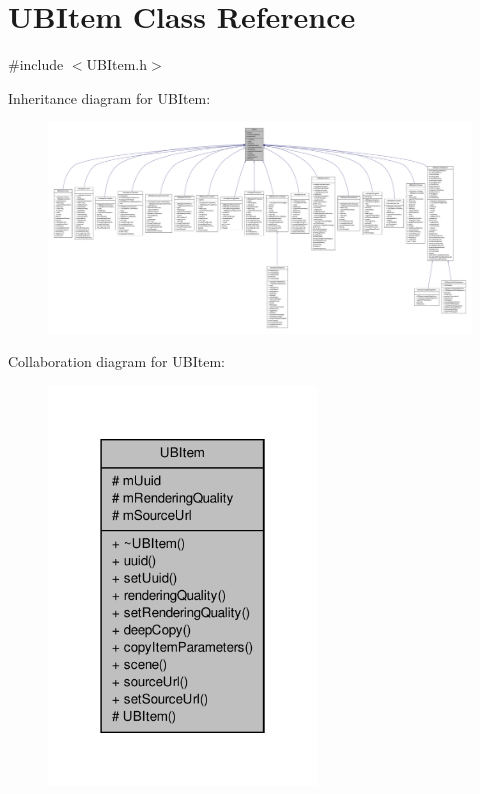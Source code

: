\hypertarget{class_u_b_item}{\section{U\-B\-Item Class Reference}
\label{d8/d1e/class_u_b_item}
}


{\ttfamily \#include $<$U\-B\-Item.\-h$>$}



Inheritance diagram for U\-B\-Item\-:
\nopagebreak
\begin{figure}[H]
\begin{center}
\leavevmode
\includegraphics[width=350pt]{d3/d90/class_u_b_item__inherit__graph}
\end{center}
\end{figure}


Collaboration diagram for U\-B\-Item\-:
\nopagebreak
\begin{figure}[H]
\begin{center}
\leavevmode
\includegraphics[width=202pt]{d4/d87/class_u_b_item__coll__graph}
\end{center}
\end{figure}
